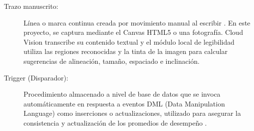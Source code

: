 \documentclass[12pt]{article}
\begin{document}
\begin{description}
    \item[Trazo manuscrito:] Línea o marca continua creada por movimiento manual al escribir \cite{plamondon2000online}. En este proyecto, se captura mediante el Canvas HTML5 o una fotografía. Cloud Vision transcribe su contenido textual y el módulo local de legibilidad utiliza las regiones reconocidas y la tinta de la imagen para calcular sugerencias de alineación, tamaño, espaciado e inclinación.
    \item[Trigger (Disparador):] Procedimiento almacenado a nivel de base de datos que se invoca automáticamente en respuesta a eventos DML (Data Manipulation Language) como inserciones o actualizaciones, utilizado para asegurar la consistencia y actualización de los promedios de desempeño \cite{msTrigger}.
\end{description}


\newpage

\renewcommand{\refname}{Referencias}


\sloppy


\end{document}
